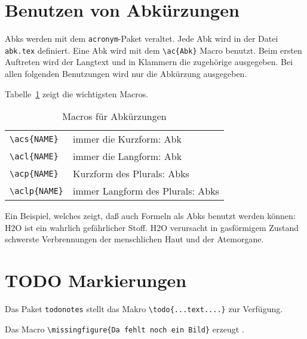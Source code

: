 
\section{Benutzen von Abkürzungen}

\acp{Abk} %
werden mit dem \verb+acronym+-Paket veraltet.
Jede
\ac{Abk} %
wird in der Datei \texttt{abk.tex} definiert.
Eine \ac{Abk} wird mit dem \verb+\ac{Abk}+  Macro benutzt. Beim ersten Auftreten
wird der Langtext und in Klammern die zugehörige  ausgegeben. Bei allen
folgenden Benutzungen wird nur die Abkürzung ausgegeben.

Tabelle~\ref{acronym-macros} zeigt die wichtigsten Macros.
\begin{table}[ht]
\begin{center}
\begin{tabular}{|ll|}\hline
\verb+\acs{NAME}+  & immer die Kurzform: \acs{Abk}		\\
\verb+\acl{NAME}+  & immer die Langform: \acl{Abk}		\\
\verb+\acp{NAME}+  & Kurzform des Plurals: \acp{Abk}		\\
\verb+\aclp{NAME}+ & immer Langform des Plurals: \aclp{Abk}	\\\hline
\end{tabular}
\end{center}
\caption{\label{acronym-macros}Macros für Abkürzungen}
\end{table}

Ein Beispiel, welches zeigt, daß auch Formeln als \acp{Abk} benutzt werden können:\\
\ac{H2O} ist ein wahrlich gefährlicher Stoff. \ac{H2O} verursacht in gasförmigem
Zustand schwerste Verbrennungen der menschlichen Haut und der Atemorgane.


\section{TODO Markierungen}

Das Paket \texttt{todonotes} stellt das Makro
\verb+\todo{...text....}+ zur Verfügung.

Das Macro \verb+\missingfigure{Da fehlt noch ein Bild}+ erzeugt
.

